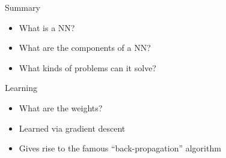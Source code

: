 \documentclass[aspectratio=169]{beamer}
\begin{document}

\begin{frame}{Summary}

\begin{itemize}
\item What is a NN?
\item What are the components of a NN?
\item What kinds of problems can it solve?
\end{itemize}
\end{frame}

\begin{frame}{Learning}

\begin{itemize}
\item What are the weights?
\item Learned via gradient descent
\item Gives rise to the famous ``back-propagation'' algorithm
\end{itemize}
\end{frame}
\end{document}
